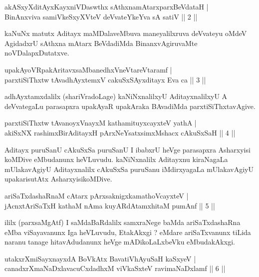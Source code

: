 \begin{shl}
akASxyXditAyxKayxniVDaswthx sAthxnamAtarxparxBeVdataH | \\
BinAnxviva samiVkeSxyXVteV deVvateYkeYva sA satiV \hfill ||  2 || 
\end{shl}

\begin{artha}
kaNuNx matutx Aditayx maMDalaveMbuva maneyalilxruva deVvateyu oMdeV AgidadxrU sAthxna mAtarx BeVdadiMda BinanxvAgiruvaMte noVDalapxDutatxve.
\end{artha}

\begin{shl}
upakAyoVRpakAritavxsaMbanedhxVneVtareVtaramf | \\
parxtiSiThxtw tAvadhAyxtemxV cakuSxSAyxditayx Eva ca \hfill ||  3 || 
\end{shl}

\begin{artha}
adhAyxtamxdalilx (shariVradoLage) kaNiNxnalilxyU AditayxnalilxyU A deVvategaLu parasapxra upakAyaR upakAraka BAvadiMda parxtiSiThxtavAgive.
\end{artha}

\begin{shl}
parxtiSiThxtw tAvanoyxVnayxM kathamituyxcayxteV yathA  | \\
akiSxNX rashimxBirAditayxH pArxNeYsatxsimxMshacx cAkuSxSaH \hfill ||  4 || 
\end{shl}

\begin{artha}
Aditayx puruSanU cAkuSxSa puruSanU I ibabxrU heVge parasapxra Asharxyisi koMDive eMbudanunx heVLuvudu. kaNiNxnalilx Aditayxnu kiraNagaLa mUlakavAgiyU Aditayxnalilx cAkuSxSa puruSanu iMdirxyagaLa mUlakavAgiyU upakarisutAtx AsharxyisikoMDive.
\end{artha}

\begin{shl}
ariSaTxdashaRnaM cAtarx pArxsaknigxkamathoVcayxteV | \\
jAcnxtAriSaTxH kathaM nAma kuyARdAtamxhitaM pumAnf \hfill ||  5 || 
\end{shl}

\begin{artha}
ililx (parxsaMgAtf) I saMdaBaRdalilx samxraNege baMda ariSaTxdashaRna eMba viSayavanunx Iga heVLuvudu, EtakAkxgi ? eMdare ariSaTxvanunx tiLida naranu tanage hitavAdudanunx heVge mADikoLaLxbeVku eMbudakAkxgi.
\end{artha}

\begin{shl}
\footnotemark{}utakxrXmiSayxnayxdA BoVkAtx BavatiVhA\s \s yuSaH kaSxyeV | \\
canadxrXmaNaDxlavacuCxdadhxM viVkaSxteV ravimaNaDxlamf \hfill ||  6 || 
\end{shl}

